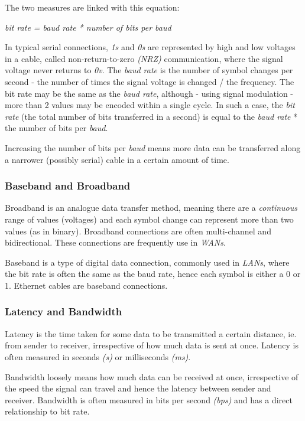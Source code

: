 \documentclass[9pt]{article}
\begin{document}
The two measures are linked with this equation:

\emph{bit rate = baud rate * number of bits per baud}

In typical serial connections, \emph{1s} and \emph{0s} are represented by high and low voltages in a cable, called non-return-to-zero \emph{(NRZ)} communication, where the signal voltage never returns to \emph{0v}. The \emph{baud rate} is the number of symbol changes per second - the number of times the signal voltage is changed / the frequency. The bit rate may be the same as the \emph{baud rate}, although - using signal modulation - more than 2 values may be encoded within a single cycle. In such a case, the \emph{bit rate} (the total number of bits transferred in a second) is equal to the \emph{baud rate} * the number of bits per \emph{baud}.

Increasing the number of bits per \emph{baud} means more data can be transferred along a narrower (possibly serial) cable in a certain amount of time.

\subsubsection{Baseband and Broadband}
\label{sec:org33aa9f6}

Broadband is an analogue data transfer method, meaning there are a \emph{continuous} range of values (voltages) and each symbol change can represent more than two values (as in binary). Broadband connections are often multi-channel and bidirectional. These connections are frequently use in \emph{WANs}.

Baseband is a type of digital data connection, commonly used in \emph{LANs}, where the bit rate is often the same as the baud rate, hence each symbol is either a 0 or 1. Ethernet cables are baseband connections.

\subsubsection{Latency and Bandwidth}
\label{sec:org09bc459}

Latency is the time taken for some data to be transmitted a certain distance, ie. from sender to receiver, irrespective of how much data is sent at once. Latency is often measured in seconds \emph{(s)} or milliseconds \emph{(ms)}.

Bandwidth loosely means how much data can be received at once, irrespective of the speed the signal can travel and hence the latency between sender and receiver. Bandwidth is often measured in bits per second \emph{(bps)} and has a direct relationship to bit rate.
\end{document}
